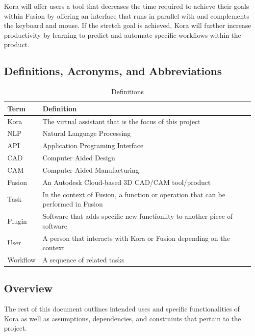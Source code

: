 \documentclass[onecolumn, draftclsnofoot,10pt, compsoc]{IEEEtran}
\def \botname{Kora\xspace}
\begin{document}
        \botname will offer users a tool that decreases the time required to achieve their goals within Fusion by offering an interface that runs in parallel with and complements the keyboard and mouse.
        If the stretch goal is achieved, \botname will further increase productivity by learning to predict and automate specific workflows within the product.
        

    \subsection{Definitions, Acronyms, and Abbreviations}
        \begin{table}[h]
            \centering
            \caption{Definitions}
            \label{my-label}
            \begin{tabular}{|l|l|}
                \hline
                \textbf{Term} & \textbf{Definition} \\ \hline
                \botname & The virtual assistant that is the focus of this project \\ \hline
                NLP & Natural Language Processing \\ \hline
                API & Application Programing Interface \\ \hline
                CAD & Computer Aided Design \\ \hline
                CAM & Computer Aided Manufacturing \\ \hline
                Fusion & An Autodesk Cloud-based 3D CAD/CAM tool/product \\ \hline
                Task & In the context of Fusion, a function or operation that can be performed in Fusion \\ \hline
                Plugin & Software that adds specific new functionlity to another piece of software \\ \hline
                User & A person that interacts with \botname or Fusion depending on the context \\ \hline
                Workflow & A sequence of related tasks \\ \hline
            \end{tabular}
        \end{table}
    \subsection{Overview}
        The rest of this document outlines intended uses and specific functionalities of \botname as well as assumptions, dependencies, and constraints that pertain to the project. 
\end{document}
